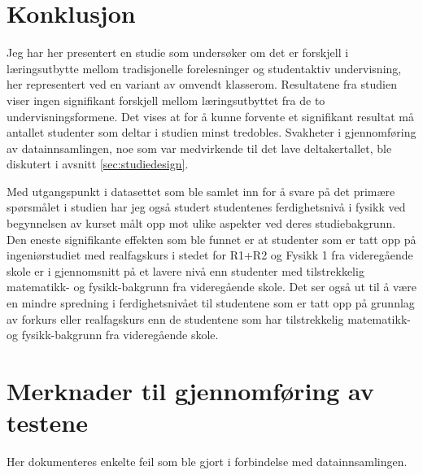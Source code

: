 \documentclass[a4paper,norsk,12pt]{article}
\begin{document}
\section{Konklusjon}
Jeg har her presentert en studie som undersøker om det er forskjell i læringsutbytte mellom tradisjonelle forelesninger og studentaktiv undervisning, her representert ved en variant av omvendt klasserom. Resultatene fra studien viser ingen signifikant forskjell mellom læringsutbyttet fra de to undervisningsformene. Det vises at for å kunne forvente et signifikant resultat må antallet studenter som deltar i studien minst tredobles. Svakheter i gjennomføring av datainnsamlingen, noe som var medvirkende til det lave deltakertallet, ble diskutert i avsnitt \ref{sec:studiedesign}. 

Med utgangspunkt i datasettet som ble samlet inn for å svare på det primære spørsmålet i studien har jeg også studert studentenes ferdighetsnivå i fysikk ved begynnelsen av kurset målt opp mot ulike aspekter ved deres studiebakgrunn. Den eneste signifikante effekten som ble funnet er at studenter som er tatt opp på ingeniørstudiet med realfagskurs i stedet for R1+R2 og Fysikk 1 fra videregående skole er i gjennomsnitt på et lavere nivå enn studenter med tilstrekkelig matematikk- og fysikk-bakgrunn fra videregående skole. Det ser også ut til å være en mindre spredning i ferdighetsnivået til studentene som er tatt opp på grunnlag av forkurs eller realfagskurs enn de studentene som har tilstrekkelig matematikk- og fysikk-bakgrunn fra videregående skole.

\appendix
\section{Merknader til gjennomføring av testene}
\label{sec:merknader}
Her dokumenteres enkelte feil som ble gjort i forbindelse med datainnsamlingen. 
\end{document}
